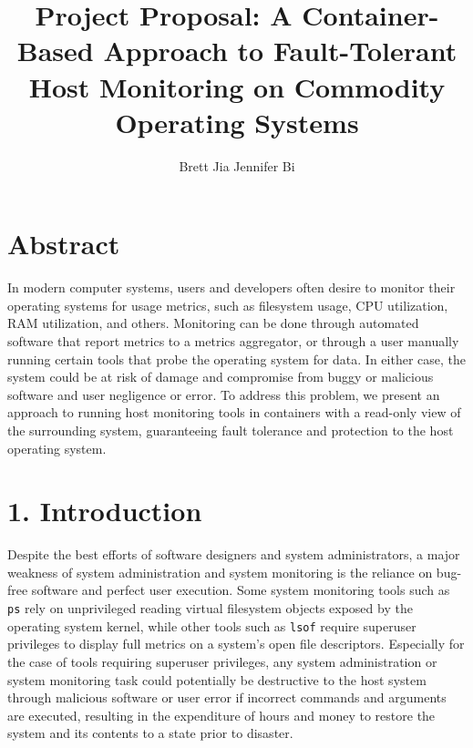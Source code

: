 \documentclass{proc}
\begin{document}
\title{Project Proposal: A Container-Based Approach to Fault-Tolerant Host Monitoring on Commodity Operating Systems}

\author{Brett Jia \hspace{1em} Jennifer Bi}

\maketitle

\section*{Abstract}

In modern computer systems, users and developers often desire to monitor their operating systems for usage metrics, such as filesystem usage, CPU utilization, RAM utilization, and others. Monitoring can be done through automated software that report metrics to a metrics aggregator, or through a user manually running certain tools that probe the operating system for data. In either case, the system could be at risk of damage and compromise from buggy or malicious software and user negligence or error. To address this problem, we present an approach to running host monitoring tools in containers with a read-only view of the surrounding system, guaranteeing fault tolerance and protection to the host operating system.

\section*{1. Introduction}

Despite the best efforts of software designers and system administrators, a major weakness of system administration and system monitoring is the reliance on bug-free software and perfect user execution. Some system monitoring tools such as \texttt{ps} rely on unprivileged reading virtual filesystem objects exposed by the operating system kernel, while other tools such as \texttt{lsof} require superuser privileges to display full metrics on a system's open file descriptors. Especially for the case of tools requiring superuser privileges, any system administration or system monitoring task could potentially be destructive to the host system through malicious software or user error if incorrect commands and arguments are executed, resulting in the expenditure of hours and money to restore the system and its contents to a state prior to disaster.
\end{document}
